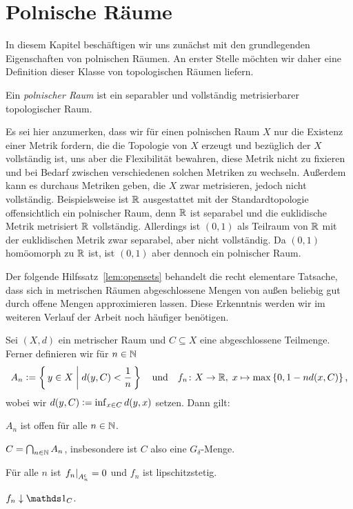 \documentclass[../main/main.tex]{subfiles}
\begin{document}
	
	\section{Polnische Räume}
	
	In diesem Kapitel beschäftigen wir uns zunächst mit den grundlegenden Eigenschaften von polnischen Räumen. 
	An erster Stelle möchten wir daher eine Definition dieser Klasse von topologischen Räumen liefern.
	
	\begin{Definition}
		Ein \emph{polnischer Raum} ist ein separabler und vollständig metrisierbarer topologischer Raum.
	\end{Definition}

	Es sei hier anzumerken, dass wir für einen polnischen Raum $X$ nur die Existenz einer Metrik fordern,
	die die Topologie von $X$ erzeugt und bezüglich der $X$ vollständig ist, uns aber die Flexibilität
	bewahren, diese Metrik nicht zu fixieren und bei Bedarf zwischen verschiedenen solchen Metriken
	zu wechseln. Außerdem kann es durchaus Metriken geben, die $X$ zwar metrisieren, jedoch nicht vollständig.
	Beispielsweise ist $\mathbb{R}$ ausgestattet mit der Standardtopologie offensichtlich ein polnischer Raum,
	denn $\mathbb{R}$ ist separabel und die euklidische Metrik metrisiert $\mathbb{R}$ vollständig. 
	Allerdings ist $(0, 1)$ als Teilraum von $\mathbb{R}$ mit der euklidischen Metrik zwar separabel, aber nicht vollständig.
	Da $(0, 1)$ homöomorph zu $\mathbb{R}$ ist, ist $(0, 1)$ aber dennoch ein polnischer Raum.

	Der folgende Hilfssatz~\ref{lem:opensets} behandelt die recht elementare Tatsache, dass sich in metrischen Räumen 
	abgeschlossene Mengen von außen beliebig gut durch offene Mengen approximieren lassen. 
	Diese Erkenntnis werden wir im weiteren Verlauf der Arbeit noch häufiger benötigen.
	
	\begin{Hilfssatz}
		\label{lem:opensets}
		Sei $(X, d)$ ein metrischer Raum und $C \subseteq X$ eine abgeschlossene 
		Teilmenge. Ferner definieren wir für $n \in \mathbb{N}$
		$$ A_n \vcentcolon = \left\{\, y \in X \; \middle| \; d(y, C) < \frac{1}{n} \,\right\} \quad \text{und} \quad 
		f_n \colon X \to \mathbb{R}, \; x \mapsto \max \left\{0, 1-n d(x, C)\right\}  \text{,}$$
		wobei wir $d(y, C) \vcentcolon = \inf_{x \in C} d(y, x)$ setzen.
		Dann gilt:
		\begin{enumeratethm}
			\item $A_n$ ist offen für alle $n \in \mathbb{N}$.
			\item $C = \bigcap_{n \in \mathbb{N}} A_n$, insbesondere ist $C$ also eine $G_\delta$-Menge.
			\item Für alle $n$ ist $\left.f_n\right|_{A_n^\mathsf{c}} = 0$ und $f_n$ ist lipschitzstetig.
			\item $f_n \convdown \indfct_C$.
		\end{enumeratethm}
	\end{Hilfssatz}
	
\end{document}
